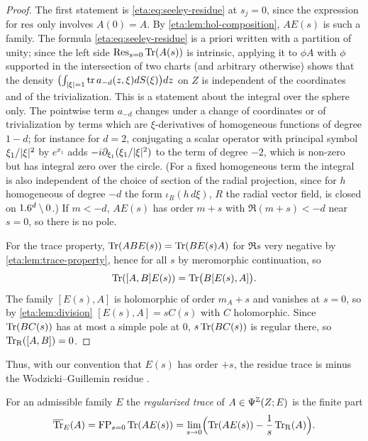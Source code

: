 \begin{proof} The first statement is \eqref{eta:eq:seeley-residue} at $s_j=0$, since the
expression for $\operatorname{res}$ only involves $A(0)=A$. By \cref{eta:lem:hol-composition},
$AE(s)$ is such a family. The formula \eqref{eta:eq:seeley-residue} is a priori written
with a partition of unity; since the left side $\operatorname*{Res}_{s=0}\operatorname{Tr}(A(s))$ is
intrinsic, applying it to $\phi A$ with $\phi$ supported in the intersection of two charts
(and arbitrary otherwise) shows that the density
$\bigl(\int_{\lvert \xi\rvert=1}\operatorname{tr} a_{-d}(z,\xi)dS(\xi)\bigr)dz$ on $Z$ is independent of the
coordinates and of the trivialization. This is a statement about the integral over
the sphere only. The pointwise term $a_{-d}$ changes under a change of coordinates
or of trivialization by terms which are $\xi$-derivatives of homogeneous functions of
degree $1-d$; for instance for $d=2$, conjugating a scalar operator with principal
symbol $\xi_1/\lvert \xi\rvert^2$ by $e^{x_1}$ adds $-i\partial_{\xi_1}(\xi_1/\lvert \xi\rvert^2)$ to the term of
degree $-2$, which is non-zero but has integral zero over the circle. (For a fixed
homogeneous term the integral is also independent of the choice of section of the
radial projection, since for $h$ homogeneous of degree $-d$ the form
$\iota_R(h\,d\xi)$, $R$ the radial vector field, is closed on $1.6^d\setminus0$.) If
$m<-d$, $AE(s)$ has order
$m+s$ with $\Re(m+s)<-d$ near $s=0$, so there is no pole.

For the trace property, $\operatorname{Tr}(ABE(s))=\operatorname{Tr}(BE(s)A)$ for $\Re s$ very negative by
\cref{eta:lem:trace-property}, hence for all $s$ by meromorphic continuation, so
\[
\operatorname{Tr}([A,B]E(s))=\operatorname{Tr}\bigl(B[E(s),A]\bigr).
\]
The family $[E(s),A]$ is holomorphic of order $m_A+s$ and vanishes at $s=0$, so by
\cref{eta:lem:division} $[E(s),A]=sC(s)$ with $C$ holomorphic. Since $\operatorname{Tr}(BC(s))$ has
at most a simple pole at $0$, $s\operatorname{Tr}(BC(s))$ is regular there, so $\operatorname{Tr}_{\mathrm{R}}([A,B])=0$.
\end{proof}

Thus, with our convention that $E(s)$ has order $+s$, the residue trace is minus the
Wodzicki--Guillemin residue \cite{Wodzicki-residue,Guillemin-residue}.

\begin{definition}\label{eta:def:regularized-trace}
For an admissible family $E$ the \emph{regularized trace} of $A\in\Psi^{\mathbb{Z}}(Z;E)$ is
the finite part
\[
\overline{\operatorname{Tr}}_E(A)=\operatorname{FP}_{s=0}\operatorname{Tr}(AE(s))=\lim_{s\to0}\Bigl(\operatorname{Tr}(AE(s))-\frac1s\operatorname{Tr}_{\mathrm{R}}(A)\Bigr).
\]
\end{definition}

